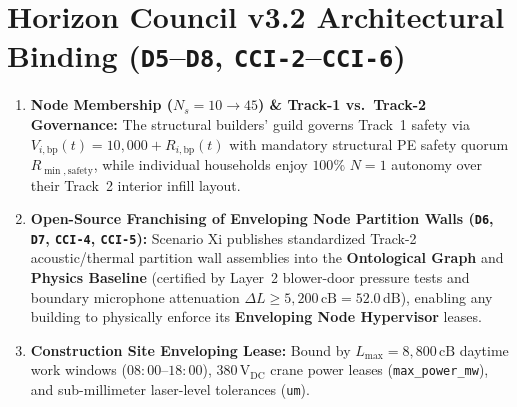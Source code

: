 \section{Horizon Council v3.2 Architectural Binding (\texttt{D5}--\texttt{D8}, \texttt{CCI-2}--\texttt{CCI-6})}
\begin{enumerate}
    \item \textbf{Node Membership ($N_s = 10 \to 45$) \& Track-1 vs.\ Track-2 Governance:} The structural builders' guild governs Track~1 safety via $V_{i,\mathrm{bp}}(t) = 10{,}000 + R_{i,\mathrm{bp}}(t)$ with mandatory structural PE safety quorum $R_{\min,\mathrm{safety}}$, while individual households enjoy $100\%$ $N=1$ autonomy over their Track~2 interior infill layout.
    \item \textbf{Open-Source Franchising of Enveloping Node Partition Walls (\texttt{D6}, \texttt{D7}, \texttt{CCI-4}, \texttt{CCI-5}):} Scenario Xi publishes standardized Track-2 acoustic/thermal partition wall assemblies into the \textbf{Ontological Graph} and \textbf{Physics Baseline} (certified by Layer~2 blower-door pressure tests and boundary microphone attenuation $\Delta L \ge 5{,}200\,\mathrm{cB} = 52.0\,\mathrm{dB}$), enabling any building to physically enforce its \textbf{Enveloping Node Hypervisor} leases.
    \item \textbf{Construction Site Enveloping Lease:} Bound by $L_{\max} = 8{,}800\,\mathrm{cB}$ daytime work windows ($08{:}00\text{--}18{:}00$), $380\,\mathrm{V}_{\mathrm{DC}}$ crane power leases (\texttt{max\_power\_mw}), and sub-millimeter laser-level tolerances (\texttt{um}).
\end{enumerate}

